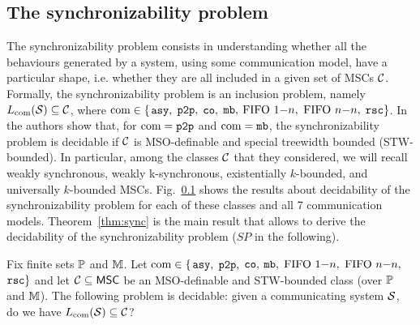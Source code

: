 \subsection{The synchronizability problem}

The synchronizability problem consists in understanding whether all the behaviours generated by a system, using some communication model, have a particular shape, i.e.  whether they are all included in a given set of MSCs $\mathcal{C}$. Formally, the synchronizability problem is an inclusion problem, namely $L_{\textup{com}}(\mathcal{S}) \subseteq \mathcal{C}$, where $\textup{com} \in \{$$\mathtt{asy}, $ $\mathtt{p2p}, $ $\mathtt{co}, $ $\mathtt{mb}, $ $\text{FIFO } 1\mathsf{-}n, $ $\text{FIFO } n\mathsf{-}n, $ $\mathtt{rsc}\}$. In \cite{BolligFG21} the authors show that, for $\textup{com} = \mathtt{p2p}$ and $\textup{com} = \mathtt{mb}$, the synchronizability problem is decidable if $\mathcal{C}$ is MSO-definable and special treewidth bounded (STW-bounded). In particular, among the classes $\mathcal{C}$ that they considered, we will recall weakly synchronous, weakly k-synchronous, existentially $k$-bounded, and universally $k$-bounded MSCs. Fig.~\ref{} shows the results about decidability of the synchronizability problem for each of these classes and all 7 communication models. Theorem~\ref{thm:sync} is the main result that allows to derive the decidability of the synchronizability problem ($SP$ in the following).

\begin{theorem}\label{thm:sync}
	Fix finite sets $\mathbb{P}$ and $\mathbb{M}$.
	Let $\textup{com} \in \{$$\mathtt{asy}, $ $\mathtt{p2p}, $ $\mathtt{co}, $ $\mathtt{mb}, $ $\text{FIFO } 1\mathsf{-}n, $ $\text{FIFO } n\mathsf{-}n, $ $\mathtt{rsc}\}$ and let $\mathcal{C} \subseteq \mathsf{MSC}$ be an MSO-definable and STW-bounded class (over $\mathbb{P}$ and $\mathbb{M}$).
	The following problem is decidable:
	given a communicating system $\mathcal{S}$, do we have $L_{\textup{com}}(\mathcal{S}) \subseteq \mathcal{C}$?
\end{theorem}





